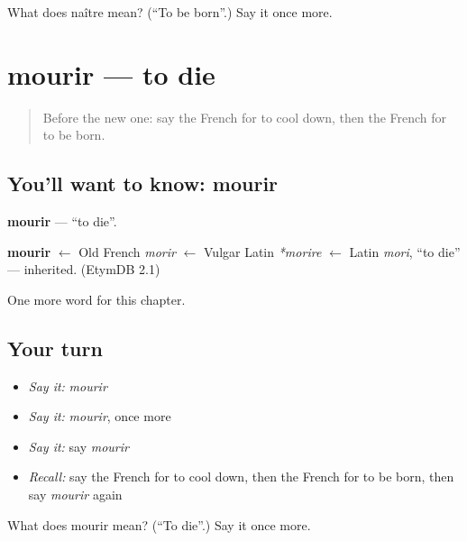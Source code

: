 \begin{tcolorbox}[breakable,colback=teal!4,colframe=teal!35!black,title={Before you move on}]
What does naître mean? (\textquotedblleft{}To be born\textquotedblright{}.) Say it once more.
\end{tcolorbox}
\section[mourir]{mourir — to die}

\label{lesson:FR-C207-mourir}



\begin{quote}
Before the new one: say the French for to cool down, then the French for to be born.
\end{quote}

\subsection*{You'll want to know: mourir}
\textbf{mourir} — \textquotedblleft{}to die\textquotedblright{}.

\begin{cousinweb}
\textbf{mourir} $\leftarrow$ Old French \emph{morir} $\leftarrow$ Vulgar Latin \emph{*morire} $\leftarrow$ Latin \emph{mori}, \textquotedblleft{}to die\textquotedblright{} — inherited. (EtymDB 2.1)
\end{cousinweb}

\begin{grammarlens}[title={What you've built}]
One more word for this chapter.
\end{grammarlens}

\subsection*{Your turn}
\begin{itemize}
\raggedright
  \item \emph{Say it:} \emph{mourir}
  \item \emph{Say it:} \emph{mourir}, once more
  \item \emph{Say it:} say \emph{mourir}
  \item \emph{Recall:} say the French for to cool down, then the French for to be born, then say \emph{mourir} again
\end{itemize}

\begin{tcolorbox}[breakable,colback=teal!4,colframe=teal!35!black,title={Before you move on}]
What does mourir mean? (\textquotedblleft{}To die\textquotedblright{}.) Say it once more.
\end{tcolorbox}
